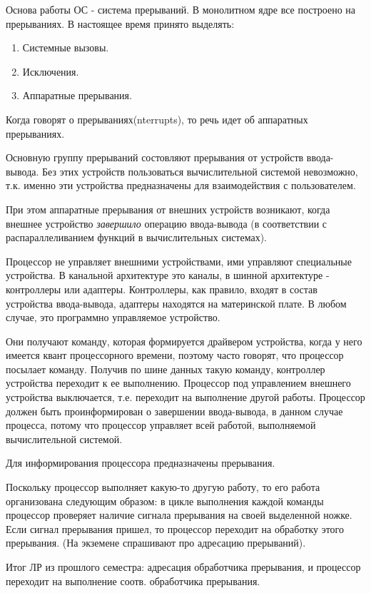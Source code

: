 \documentclass[12pt,a4paper]{scrreprt}
\begin{document}
Основа работы ОС - система прерываний. В монолитном ядре все построено на прерываниях. В настоящее время принято выделять:

\begin{enumerate}
	\item Системные вызовы.
	\item Исключения.
	\item Аппаратные прерывания.
\end{enumerate}

Когда говорят о прерываниях(nterrupts), то речь идет об аппаратных прерываниях. 

Основную группу прерываний состовляют прерывания от устройств ввода-вывода. Без этих устройств пользоваться вычислительной системой невозможно, т.к. именно эти устройства предназначены для взаимодействия с пользователем. 

При этом аппаратные прерывания от внешних устройств возникают, когда внешнее устройство \textit{завершило} операцию ввода-вывода (в соответствии с распараллеливанием функций в вычислительных системах). 

Процессор не управляет внешними устройствами, ими управляют специальные устройства. В канальной архитектуре это каналы, в шинной архитектуре - контроллеры или адаптеры. Контроллеры, как правило, входят в состав устройства ввода-вывода, адаптеры находятся на материнской плате. В любом случае, это программно управляемое устройство. 

Они получают команду, которая формируется драйвером устройства, когда у него имеется квант процессорного времени, поэтому часто говорят, что процессор посылает команду. Получив по шине данных такую команду, контроллер устройства переходит к ее выполнению. Процессор под управлением внешнего устройства выключается, т.е. переходит на выполнение другой работы. Процессор должен быть проинформирован о завершении ввода-вывода, в данном случае процесса, потому что процессор управляет всей работой, выполняемой вычислительной системой.

Для информирования процессора предназначены прерывания. 

Поскольку процессор выполняет какую-то другую работу, то его работа организована следующим образом: в цикле выполнения каждой команды процессор проверяет наличие сигнала прерывания на своей выделенной ножке. Если сигнал прерывания пришел, то процессор переходит на обработку этого прерывания. (На экземене спрашивают про адресацию прерываний).

Итог ЛР из прошлого семестра: адресация обработчика прерывания, и процессор переходит на выполнение соотв. обработчика прерывания. 
\end{document}
